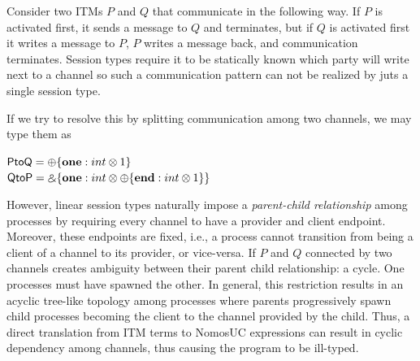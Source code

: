 Consider two ITMs $P$ and $Q$ that communicate in the following way. If $P$ is activated first,
it sends a message to $Q$ and terminates, but if $Q$ is activated first it writes a message to $P$, 
$P$ writes a message back, and communication terminates.
Session types require it to be statically known which party will write next to a channel so such
a communication pattern can not be realized by juts a single session type.

If we try to resolve this by splitting communication among two channels, we may type them as
\vspace{2mm}

{\centering
 $\mathsf{PtoQ} = \oplus \{ \mathbf{one}: int \otimes 1 \}$ \\
 $\mathsf{QtoP} = \mathbin{\binampersand} \{ \mathbf{one}: int \otimes \oplus \{ \mathbf{end}: int \otimes 1 \} \}$
\par}
\vspace{2mm}
However, linear session types naturally impose a \emph{parent-child relationship} among processes by requiring
every channel to have a provider and client endpoint.
Moreover, these endpoints are fixed, i.e., a process cannot transition from being a client of
a channel to its provider, or vice-versa.
If $P$ and $Q$ connected by two channels creates ambiguity between their parent child relationship: a cycle. One processes must have spawned the other. 
In general, this restriction results in an acyclic tree-like topology among processes where parents progressively
spawn child processes becoming the client to the channel provided by the child.
Thus, a direct translation from ITM terms to NomosUC expressions can result in cyclic
dependency among channels, thus causing the program to be ill-typed.

